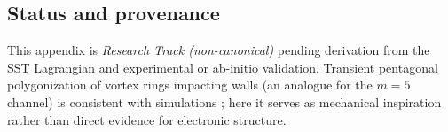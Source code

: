 \subsection*{Status and provenance}
This appendix is \emph{Research Track (non-canonical)} pending derivation from the SST Lagrangian
and experimental or ab-initio validation.
Transient pentagonal polygonization of vortex rings impacting walls (an analogue for the \(m{=}5\) channel)
is consistent with simulations \cite{orlandi1993vortex}; here it serves as mechanical inspiration rather than direct evidence for electronic structure.
